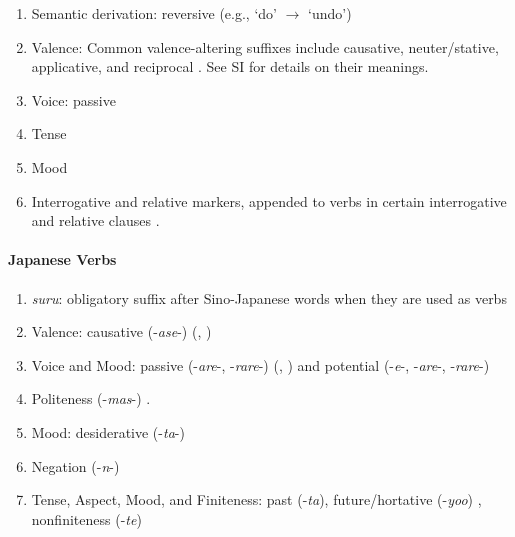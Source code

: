 \documentclass[11pt,letterpaper]{article}
\begin{document}

\begin{enumerate}
\item Semantic derivation: reversive (e.g., `do' $\rightarrow$ `undo') \citep[]{doke1967textbook}
\item Valence: Common valence-altering suffixes include causative, neuter/stative, applicative, and reciprocal \citep[--338]{doke1967textbook}. See SI for details on their meanings.
    \item Voice: passive \citep[]{doke1967textbook}
    \item Tense \citep[]{doke1967textbook}
    \item Mood \citep[--445]{doke1967textbook}
    \item Interrogative and relative markers, appended to verbs in certain interrogative and relative clauses \citep[, 271, 320, 714, 793]{doke1967textbook}.
\end{enumerate}



\paragraph{Japanese Verbs}


\begin{enumerate}
\item \textit{suru}: obligatory suffix after Sino-Japanese words when they are used as verbs
\item Valence: causative (-\textit{ase}-) (\citet[142]{hasegawa2014japanese}, \citet[Chapter 13]{kaiser2013japanese})
\item Voice and Mood: passive (-\textit{are}-, -\textit{rare}-) (\citet[152]{hasegawa2014japanese}, \citet[Chapter 12]{kaiser2013japanese}) and potential (-\textit{e}-, -\textit{are}-, -\textit{rare}-) \citep[398]{kaiser2013japanese}
\item Politeness (-\textit{mas}-) \citep[190]{kaiser2013japanese}.
\item Mood: desiderative (-\textit{ta}-) \citep[238]{kaiser2013japanese}
\item Negation (-\textit{n}-)
\item Tense, Aspect, Mood, and Finiteness: past (-\textit{ta}), future/hortative (-\textit{yoo}) \citep[229]{kaiser2013japanese}, nonfiniteness (-\textit{te}) \citep[186]{kaiser2013japanese}
\end{enumerate}
\end{document}
